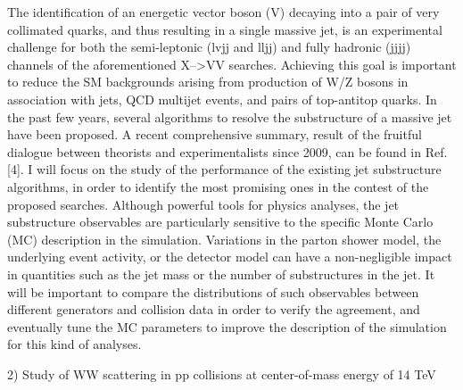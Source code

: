 \documentclass[10pt, a4paper]{article}
\begin{document}
The identification of an energetic vector boson (V) decaying into a pair of very collimated quarks, and thus resulting in a single massive jet, is an experimental challenge for both the semi-leptonic (lvjj and lljj) and fully hadronic (jjjj) channels of the aforementioned X-->VV searches. Achieving this goal is important to reduce the SM backgrounds arising from production of W/Z bosons in association with jets, QCD multijet events, and pairs of top-antitop quarks. In the past few years, several algorithms to resolve the substructure of a massive jet have been proposed. A recent comprehensive summary, result of the fruitful dialogue between theorists and experimentalists since 2009, can be found in Ref. [4]. 
I will focus on the study of the performance of the existing jet substructure algorithms, in order to identify the most promising ones in the contest of the proposed searches. Although powerful tools for physics analyses, the jet substructure observables are particularly sensitive to the specific Monte Carlo (MC) description in the simulation. Variations in the parton shower model, the underlying event activity, or the detector model can have a non-negligible impact in quantities such as the jet mass or the number of substructures in the jet. It will be important to compare the distributions of such observables between different generators and collision data in order to verify the agreement, and eventually tune the MC parameters to improve the description of the simulation for this kind of analyses.

2) Study of WW scattering in pp collisions at center-of-mass energy of 14 TeV 
\end{document}
